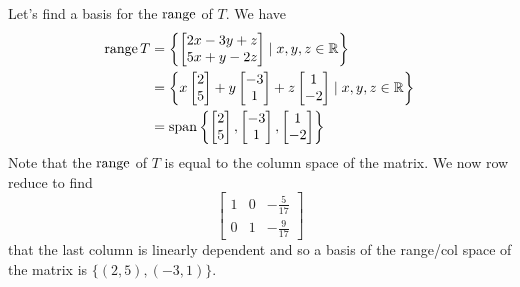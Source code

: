 \documentclass{article}
\DeclareMathOperator{\spn}{span}
\begin{document}
\begin{example}
  Let's find a basis for the $\operatorname{\text{range}}$ of $T$. We have
  \begin{align*}
    \range T & = \left\{
    \begin{bmatrix}
      2x - 3y + z \\
      5x + y - 2z \\
    \end{bmatrix} \mid x, y, z \in \R \right\} \\
             & = \left\{ x
    \begin{bmatrix}
      2 \\5\\
    \end{bmatrix} + y
    \begin{bmatrix}
      -3 \\1\\
    \end{bmatrix} + z
    \begin{bmatrix}
      1 \\-2\\
    \end{bmatrix} \mid x, y, z \in \R \right\} \\
             & = \spn \left\{
    \begin{bmatrix}
      2 \\5\\
    \end{bmatrix},
    \begin{bmatrix}
      -3 \\1\\
    \end{bmatrix},
    \begin{bmatrix}
      1 \\-2\\
    \end{bmatrix}\right\}
  \end{align*}
  Note that the $\operatorname{\text{range}}$ of $T$ is equal to the column space of the matrix. We now row reduce to find \[
    \begin{bmatrix}
      1 & 0 & -\frac{5}{17} \\
      0 & 1 & -\frac{9}{17}
    \end{bmatrix}
  \]
  that the last column is linearly dependent and so a basis of the range/col space of the matrix is $\{(2, 5), (-3, 1)\}$.
\end{example}
\end{document}
